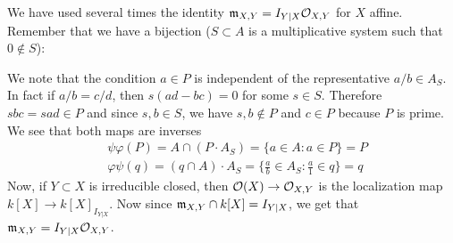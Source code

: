 \begin{remark}
    We have used several times the identity $\mathfrak{m}_{X,Y}=I_{Y|X}\mathcal{O}_{X,Y}$ for $X$ affine. 
    Remember that we have a bijection ($S\subset A$ is a multiplicative system such that $0\notin S$):
    \begin{center}
    \end{center}
    We note that the condition $a\in P$ is independent of the representative $a/b\in A_S$. In fact if 
    $a/b=c/d$, then $s(ad - bc)=0$ for some $s\in S$. Therefore $sbc=sad \in P$ and since $s,b\in S$, we have 
    $s,b\notin P$ and $c\in P$ because $P$ is prime. We see that both maps are inverses 
    \begin{equation}
        \begin{split}
            &\psi\varphi(P) = A\cap (P\cdot A_S) = \{a\in A:a\in P\}=P\\
            &\varphi\psi(q)=(q\cap A)\cdot A_S = \{\tfrac{a}{b}\in A_S: \tfrac{a}{1}\in q\}=q
        \end{split}
    \end{equation}
   Now, if $Y\subset X$ is irreducible closed, then $\mathcal{O}(X)\to\mathcal{O}_{X,Y}$ is the localization map 
   $k[X]\to k[X]_{I_{Y|X}}$. Now since $\mathfrak{m}_{X,Y}\cap k[X] = I_{Y|X}$, we get that 
   $\mathfrak{m}_{X,Y} = I_{Y|X}\mathcal{O}_{X,Y}$.
\end{remark}


